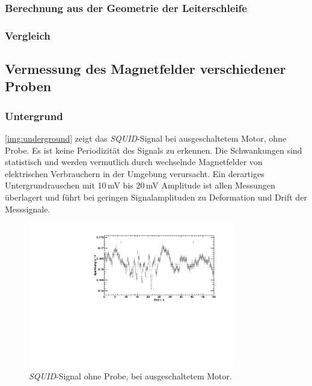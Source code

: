\subsubsection{Berechnung aus der Geometrie der Leiterschleife}

\subsubsection{Vergleich}





\subsection{Vermessung des Magnetfelder verschiedener Proben}

\subsubsection{Untergrund}
\autoref{img:underground} zeigt das \emph{SQUID}-Signal bei ausgeschaltetem Motor, ohne Probe.
Es ist keine Periodizität des Signals zu erkennen. Die Schwankungen sind statistisch
und werden vermutlich durch wechselnde Magnetfelder von elektrischen Verbrauchern in der Umgebung verursacht.
Ein derartiges Untergrundrauschen mit 10\,mV bis 20\,mV Amplitude
ist allen Messungen überlagert und führt bei geringen Signalamplituden zu
Deformation und Drift der Messsignale.

\begin{figure}[H]
\begin{center}
  \includegraphics[width=0.8\textwidth]{../img/Untergrund.pdf}
  \caption{\emph{SQUID}-Signal ohne Probe, bei ausgeschaltetem Motor.}
  \label{img:underground}
\end{center}
\end{figure}



